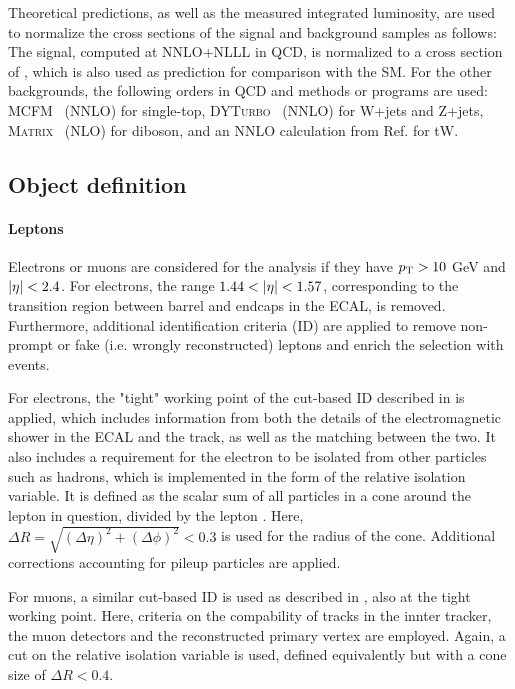Theoretical predictions, as well as the measured integrated luminosity, are used to normalize the cross sections of the signal and background samples as follows: The \ttbar signal, computed at NNLO+NLLL in QCD, is normalized to a cross section of \xsecpred, which is also used as prediction for comparison with the SM. For the other backgrounds, the following orders in QCD and methods or programs are used: \textsc{MCFM}~\cite{Campbell:2020fhf} (NNLO) for single-top, \textsc{DYTurbo}~\cite{Camarda:2019zyx} (NNLO) for W+jets and Z+jets, \textsc{Matrix}~\cite{Grazzini:2017mhc} (NLO) for diboson, and an NNLO calculation from Ref. \cite{Kidonakis:2021vob} for tW.


\subsection{Object definition}
\label{sec:ttxs:objects}

\paragraph{Leptons}

Electrons or muons are considered for the analysis if they have $p_{\mathrm{T}} > 10$ GeV and $|\eta| < 2.4$. For electrons, the range $1.44 < |\eta| < 1.57$, corresponding to the transition region between barrel and endcaps in the ECAL, is removed. Furthermore, additional identification criteria (ID) are applied to remove non-prompt or fake (i.e. wrongly reconstructed) leptons and enrich the selection with \ttbar events.

For electrons, the "tight" working point of the cut-based ID described in  is applied, which includes information from both the details of the electromagnetic shower in the ECAL and the track, as well as the matching between the two. It also includes a requirement for the electron to be isolated from other particles such as hadrons, which is implemented in the form of the relative isolation variable. It is defined as the scalar \pt sum of all particles in a cone around the lepton in question, divided by the lepton \pt. Here, $\Delta R = \sqrt{(\Delta \eta)^2 + (\Delta \phi)^2} < 0.3$ is used for the radius of the cone. Additional corrections accounting for pileup particles are applied.

For muons, a similar cut-based ID is used as described in , also at the tight working point. Here, criteria on the compability of tracks in the innter tracker, the muon detectors and the reconstructed primary vertex are employed. Again, a cut on the relative isolation variable is used, defined equivalently but with a cone size of $\Delta R < 0.4$.

